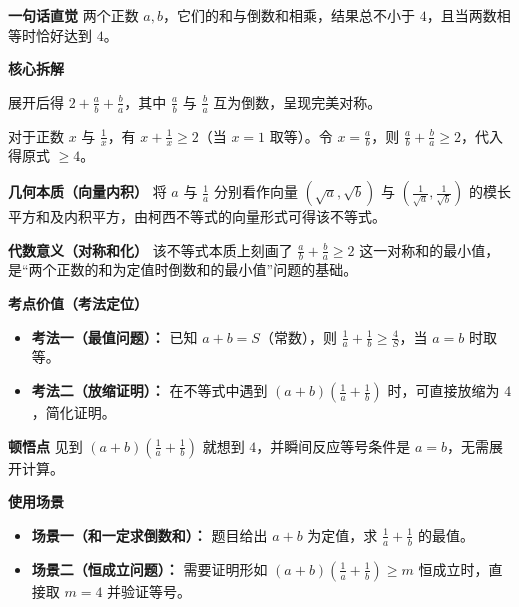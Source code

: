 \begin{explanationbox}
	\textbf{\textcolor{CExplanation}{一句话直觉}}
	两个正数 $a,b$，它们的和与倒数和相乘，结果总不小于 $4$，且当两数相等时恰好达到 $4$。

	\medskip
	\textbf{\textcolor{CExplanation}{核心拆解}}
	\begin{description}[style=nextline, leftmargin=2.8em, labelsep=0.5em, itemsep=0.45em]
		\item[\textbf{要点一（结构对称）：}]
			展开后得 $2+\frac{a}{b}+\frac{b}{a}$，其中 $\frac{a}{b}$ 与 $\frac{b}{a}$ 互为倒数，呈现完美对称。
		\item[\textbf{要点二（基本不等式）：}]
			对于正数 $x$ 与 $\frac{1}{x}$，有 $x+\frac{1}{x}\ge 2$（当 $x=1$ 取等）。令 $x=\frac{a}{b}$，则 $\frac{a}{b}+\frac{b}{a}\ge 2$，代入得原式 $\ge 4$。
	\end{description}

	\medskip
	\textbf{\textcolor{CExplanation}{几何本质（向量内积）}}
	将 $a$ 与 $\frac{1}{a}$ 分别看作向量 $(\sqrt{a},\sqrt{b})$ 与 $(\frac{1}{\sqrt{a}},\frac{1}{\sqrt{b}})$ 的模长平方和及内积平方，由柯西不等式的向量形式可得该不等式。

	\medskip
	\textbf{\textcolor{CExplanation}{代数意义（对称和化）}}
	该不等式本质上刻画了 $\frac{a}{b}+\frac{b}{a}\ge 2$ 这一对称和的最小值，是“两个正数的和为定值时倒数和的最小值”问题的基础。

	\medskip
	\textbf{\textcolor{CExplanation}{考点价值（考法定位）}}
	\begin{itemize}[leftmargin=*, itemsep=0.5em, topsep=0.4em]
		\item \textbf{考法一（最值问题）：} 已知 $a+b=S$（常数），则 $\frac{1}{a}+\frac{1}{b}\ge \frac{4}{S}$，当 $a=b$ 时取等。
		\item \textbf{考法二（放缩证明）：} 在不等式中遇到 $(a+b)(\frac{1}{a}+\frac{1}{b})$ 时，可直接放缩为 $4$，简化证明。
	\end{itemize}

	\medskip
	\textbf{\textcolor{CExplanation}{顿悟点}}
	见到 $(a+b)(\frac{1}{a}+\frac{1}{b})$ 就想到 $4$，并瞬间反应等号条件是 $a=b$，无需展开计算。

	\medskip
	\textbf{\textcolor{CExplanation}{使用场景}}
	\begin{itemize}[leftmargin=*, itemsep=0.5em, topsep=0.4em]
		\item \textbf{场景一（和一定求倒数和）：} 题目给出 $a+b$ 为定值，求 $\frac{1}{a}+\frac{1}{b}$ 的最值。
		\item \textbf{场景二（恒成立问题）：} 需要证明形如 $(a+b)(\frac{1}{a}+\frac{1}{b})\ge m$ 恒成立时，直接取 $m=4$ 并验证等号。
	\end{itemize}

\end{explanationbox}
